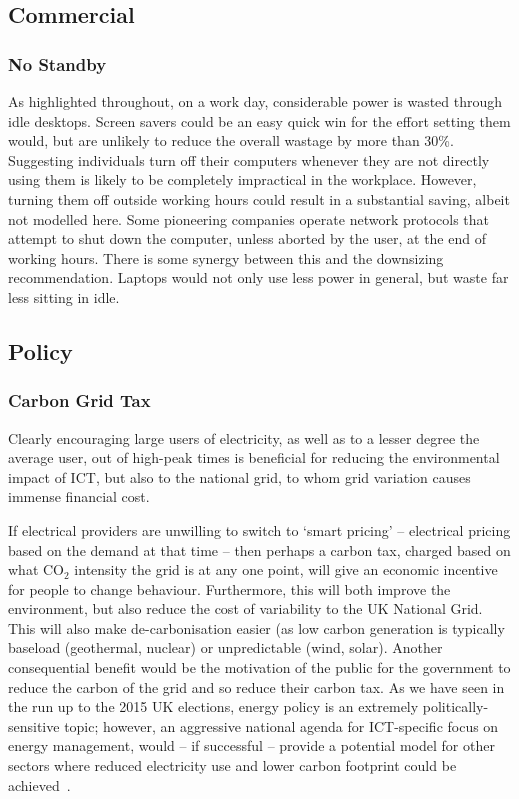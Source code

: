 \documentclass[conference]{IEEEtran}
\begin{document}
\subsection{Commercial}

\subsubsection{No Standby}

As highlighted throughout, on a work day, considerable power is wasted
through idle desktops. Screen savers could be an easy quick win for
the effort setting them would, but are unlikely to reduce the overall
wastage by more than 30\%. Suggesting individuals turn off their
computers whenever they are not directly using them is likely to be
completely impractical in the workplace. However, turning them off
outside working hours could result in a substantial saving, albeit not
modelled here. Some pioneering companies operate network protocols
that attempt to shut down the computer, unless aborted by the user, at
the end of working hours. There is some synergy between this and the
downsizing recommendation. Laptops would not only use less power in
general, but waste far less sitting in idle.

\subsection{Policy}

\subsubsection{Carbon Grid Tax}

Clearly encouraging large users of electricity, as well as to a lesser
degree the average user, out of high-peak times is beneficial for
reducing the environmental impact of ICT, but also to the national
grid, to whom grid variation causes immense financial cost.

If electrical providers are unwilling to switch to `smart pricing' --
electrical pricing based on the demand at that time -- then perhaps a
carbon tax, charged based on what CO$_2$ intensity the grid is at any
one point, will give an economic incentive for people to change
behaviour. Furthermore, this will both improve the environment, but
also reduce the cost of variability to the UK National Grid. This will
also make de-carbonisation easier (as low carbon generation is
typically baseload (geothermal, nuclear) or unpredictable (wind,
solar). Another consequential benefit would be the motivation of the
public for the government to reduce the carbon of the grid and so
reduce their carbon tax. As we have seen in the run up to the 2015 UK
elections, energy policy is an extremely politically-sensitive topic;
however, an aggressive national agenda for ICT-specific focus on
energy management, would -- if successful -- provide a potential model
for other sectors where reduced electricity use and lower carbon
footprint could be achieved~\cite{smart2020:2008,ruth:2011}.
\end{document}
